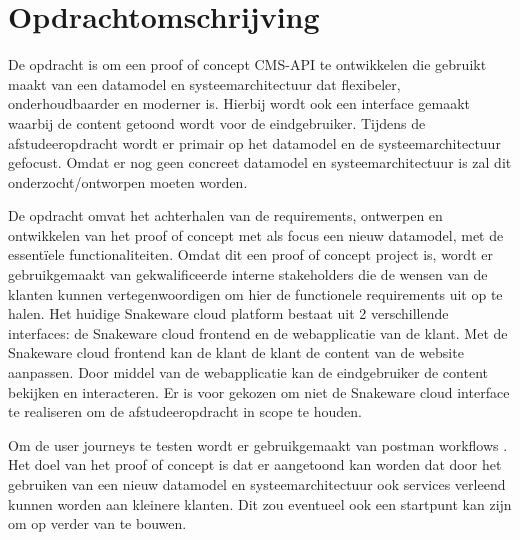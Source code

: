\section{Opdrachtomschrijving}
De opdracht is om een proof of concept CMS-API te ontwikkelen die gebruikt maakt van een datamodel en systeemarchitectuur dat flexibeler, onderhoudbaarder en moderner is.
Hierbij wordt ook een interface gemaakt waarbij de content getoond wordt voor de eindgebruiker.
Tijdens de afstudeeropdracht wordt er primair op het datamodel en de systeemarchitectuur gefocust.
Omdat er nog geen concreet datamodel en systeemarchitectuur is zal dit onderzocht/ontworpen moeten worden.

\whitespace[2]
De opdracht omvat het achterhalen van de requirements, ontwerpen en ontwikkelen van het proof of concept met als focus een nieuw datamodel, met de essentïele functionaliteiten.
Omdat dit een proof of concept project is, wordt er gebruikgemaakt van gekwalificeerde interne stakeholders die de wensen van de klanten kunnen vertegenwoordigen om hier de functionele requirements uit op te halen.
Het huidige Snakeware cloud platform bestaat uit 2 verschillende interfaces: de Snakeware cloud frontend en de webapplicatie van de klant.
Met de Snakeware cloud frontend kan de klant de klant de content van de website aanpassen.
Door middel van de webapplicatie kan de eindgebruiker de content bekijken en interacteren.
Er is voor gekozen om niet de Snakeware cloud interface te realiseren om de afstudeeropdracht in scope te houden.

\whitespace[2]
Om de user journeys te testen wordt er gebruikgemaakt van postman workflows \Parencite{PostmanWorkflows}.
Het doel van het proof of concept is dat er aangetoond kan worden dat door het gebruiken van een nieuw datamodel en systeemarchitectuur ook services verleend kunnen worden aan kleinere klanten.
Dit zou eventueel ook een startpunt kan zijn om op verder van te bouwen.

